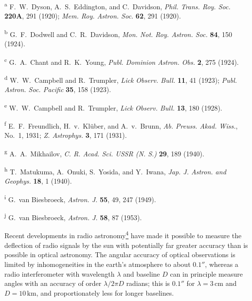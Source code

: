 \begin{table}[p]
\medskip
\begin{minipage}{0.96\textwidth}\scriptsize
\textsuperscript{a} F.~W.~Dyson, A.~S.~Eddington, and C.~Davidson,
\textit{Phil. Trans. Roy. Soc.} \textbf{220A}, 291 (1920);
\textit{Mem. Roy. Astron. Soc.} \textbf{62}, 291 (1920).\par
\textsuperscript{b} G.~F.~Dodwell and C.~R.~Davidson,
\textit{Mon. Not. Roy. Astron. Soc.} \textbf{84}, 150 (1924).\par
\textsuperscript{c} G.~A.~Chant and R.~K.~Young,
\textit{Publ. Dominion Astron. Obs.} \textbf{2}, 275 (1924).\par
\textsuperscript{d} W.~W.~Campbell and R.~Trumpler,
\textit{Lick Observ. Bull.} \textbf{11}, 41 (1923);
\textit{Publ. Astron. Soc. Pacific} \textbf{35}, 158 (1923).\par
\textsuperscript{e} W.~W.~Campbell and R.~Trumpler,
\textit{Lick Observ. Bull.} \textbf{13}, 180 (1928).\par
\textsuperscript{f} E.~F.~Freundlich, H.~v.~Kl\"uber, and A.~v.~Brunn,
\textit{Ab. Preuss. Akad. Wiss.}, No.~1, 1931;
\textit{Z. Astrophys.} \textbf{3}, 171 (1931).\par
\textsuperscript{g} A.~A.~Mikhailov,
\textit{C. R. Acad. Sci. USSR (N. S.)} \textbf{29}, 189 (1940).\par
\textsuperscript{h} T.~Matukuma, A.~Onuki, S.~Yosida, and Y.~Iwana,
\textit{Jap. J. Astron. and Geophys.} \textbf{18}, 1 (1940).\par
\textsuperscript{i} G.~van Biesbroeck,
\textit{Astron. J.} \textbf{55}, 49, 247 (1949).\par
\textsuperscript{j} G.~van Biesbroeck,
\textit{Astron. J.} \textbf{58}, 87 (1953).
\end{minipage}
\end{table}
\endgroup

Recent developments in radio
astronomy\hyperref[ch8-ref-4]{\textsuperscript{4}} have made it possible
to measure the deflection of radio signals by the sun with potentially far
greater accuracy than is possible in optical astronomy. The angular
accuracy of optical observations is limited by inhomogeneities in the
earth's atmosphere to about \(0.1''\), whereas a radio interferometer with
wavelength \(\lambda\) and baseline \(D\) can in principle measure angles
with an accuracy of order \(\lambda/2\pi D\) radians; this is \(0.1''\)
for \(\lambda=3\,\mathrm{cm}\) and \(D=10\,\mathrm{km}\), and
proportionately less for longer baselines.

